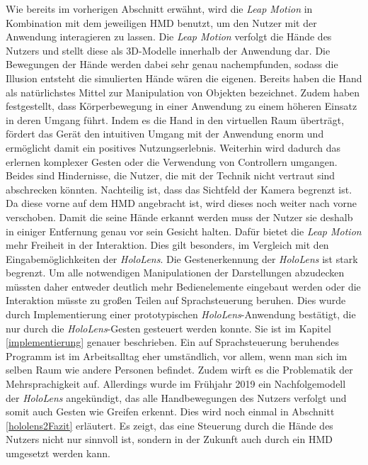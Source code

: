 Wie bereits im vorherigen Abschnitt erwähnt, wird die \textit{Leap Motion} in Kombination mit dem jeweiligen HMD benutzt, um den Nutzer mit der Anwendung interagieren zu lassen. 
Die \textit{Leap Motion} verfolgt die Hände des Nutzers und stellt diese als 3D-Modelle innerhalb der Anwendung dar. Die Bewegungen der Hände werden dabei sehr genau nachempfunden, sodass die Illusion entsteht die simulierten Hände wären die eigenen. 
Bereits \cite{Zimmerman86} haben die Hand als natürlichstes Mittel zur Manipulation von Objekten bezeichnet. Zudem haben \cite{Bianchi-Berthouze07} festgestellt, dass Körperbewegung in einer Anwendung zu einem höheren Einsatz in deren Umgang führt. Indem es die Hand in den virtuellen Raum überträgt, fördert das Gerät den intuitiven Umgang mit der Anwendung enorm und ermöglicht damit ein positives Nutzungserlebnis. Weiterhin wird dadurch das erlernen komplexer Gesten oder die Verwendung von Controllern umgangen. Beides sind Hindernisse, die Nutzer, die mit der Technik nicht vertraut sind abschrecken könnten. 
Nachteilig ist, dass das Sichtfeld der Kamera begrenzt ist. Da diese vorne auf dem HMD angebracht ist, wird dieses noch weiter nach vorne verschoben. Damit die seine Hände erkannt werden muss der Nutzer sie deshalb in einiger Entfernung genau vor sein Gesicht halten. 
Dafür bietet die \textit{Leap Motion} mehr Freiheit in der Interaktion. Dies gilt besonders, im Vergleich mit den Eingabemöglichkeiten der \textit{HoloLens}. 
Die Gestenerkennung der \textit{HoloLens} ist stark begrenzt. Um alle notwendigen Manipulationen der Darstellungen abzudecken müssten daher entweder deutlich mehr Bedienelemente eingebaut werden oder die Interaktion müsste zu großen Teilen auf Sprachsteuerung beruhen. 
Dies wurde durch Implementierung einer prototypischen \textit{HoloLens}-Anwendung bestätigt, die nur durch die \textit{HoloLens}-Gesten gesteuert werden konnte. Sie ist im Kapitel \ref{implementierung} genauer beschrieben.
Ein auf Sprachsteuerung beruhendes Programm ist im Arbeitsalltag eher umständlich, vor allem, wenn man sich im selben Raum wie andere Personen befindet. Zudem wirft es die Problematik der Mehrsprachigkeit auf. 
Allerdings wurde im Frühjahr 2019 ein Nachfolgemodell der \textit{HoloLens} angekündigt, das alle Handbewegungen des Nutzers verfolgt und somit auch Gesten wie Greifen erkennt. Dies wird noch einmal in Abschnitt \ref{hololens2Fazit} erläutert. Es zeigt, das eine Steuerung durch die Hände des Nutzers nicht nur sinnvoll ist, sondern in der Zukunft auch durch ein HMD umgesetzt werden kann.

